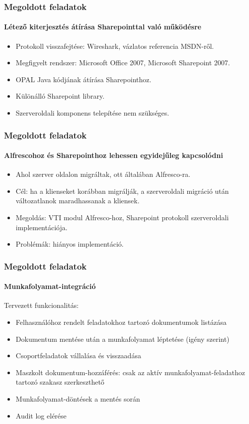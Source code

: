 \documentclass{beamer}
\begin{document}
\begin{frame}
\frametitle{Megoldott feladatok}
\framesubtitle{Létező kiterjesztés átírása Sharepointtal való működésre}
\begin{itemize}
\item Protokoll visszafejtése: Wireshark, vázlatos referencia MSDN-ről.
\item Megfigyelt rendszer: Microsoft Office 2007, Microsoft Sharepoint 2007.
\item OPAL Java kódjának átírása Sharepointhoz.
\item Különálló Sharepoint library.
\item Szerveroldali komponens telepítése nem szükséges.
\end{itemize}
\end{frame}

\begin{frame}
\frametitle{Megoldott feladatok}
\framesubtitle{Alfrescohoz és Sharepointhoz lehessen egyidejűleg kapcsolódni}
\begin{itemize}
\item Ahol szerver oldalon migráltak, ott általában Alfresco-ra.
\item Cél: ha a klienseket korábban migrálják, a szerveroldali migráció után változatlanok maradhassanak a kliensek.
\item Megoldás: VTI modul Alfresco-hoz, Sharepoint protokoll szerveroldali implementációja.
\item Problémák: hiányos implementáció.
\end{itemize}
\end{frame}

\begin{frame}
\frametitle{Megoldott feladatok}
\framesubtitle{Munkafolyamat-integráció}
Tervezett funkcionalitás:
\begin{itemize}
\item Felhasználóhoz rendelt feladatokhoz tartozó dokumentumok listázása
\item Dokumentum mentése után a munkafolyamat léptetése (igény szerint)
\item Csoportfeladatok vállalása és visszaadása
\item Maszkolt dokumentum-hozzáférés: csak az aktív munkafolyamat-feladathoz tartozó szakasz szerkeszthető
\item Munkafolyamat-döntések a mentés során
\item Audit log elérése
\end{itemize}
\end{frame}
\end{document}
